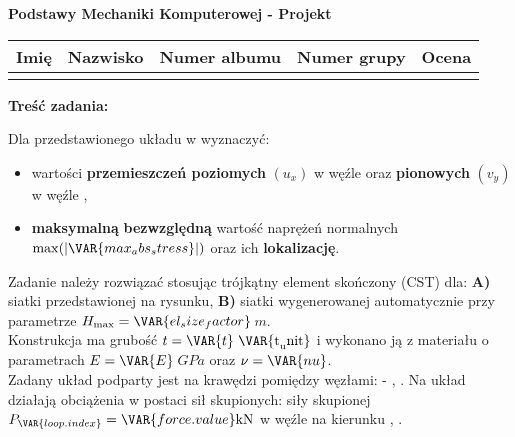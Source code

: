 \documentclass[a4paper,10pt]{article}
\begin{document}
\begin{center}
    {\Large \textbf{Podstawy Mechaniki Komputerowej - Projekt}}
    \end{center}

    \begin{table}[ht]
        \centering
        \begin{tabular}{
            m{}m{}m{}m{}m{}}
        \toprule
        Imię & Nazwisko & Numer albumu & Numer grupy  & Ocena \\ \midrule
             &          &              &              &       \\ \bottomrule
        \end{tabular}
        \label{tab:dane_studenta}
    \end{table}

    \noindent\textbf{Treść zadania:} \vspace{1mm}

    \noindent Dla przedstawionego układu w \textbf{} wyznaczyć:
    \begin{itemize}
        \item wartości \textbf{przemieszczeń poziomych} $(u_x)$ w węźle  oraz \textbf{pionowych} $(v_y)$ w węźle ,
        \item \textbf{maksymalną} \textbf{bezwzględną} wartość naprężeń normalnych $\mathrm{max}(|\VAR{max_abs_stress}|)$ oraz ich \textbf{lokalizację}.
    \end{itemize}

    \noindent Zadanie należy rozwiązać stosując trójkątny element skończony (CST) dla: \textbf{A)} siatki przedstawionej na rysunku, \textbf{B)} siatki wygenerowanej automatycznie przy parametrze $H_{\mathrm{max}} = \VAR{el_size_factor}$\,$\si{m}$. \\
    Konstrukcja ma grubość $t = \VAR{t}$\,$\si{\VAR{t_unit}}$ i wykonano ją z materiału o parametrach $E = \VAR{E}$\,$\si{GPa}$ oraz $\nu = \VAR{nu}$. \\
    Zadany układ podparty jest na krawędzi pomiędzy węzłami:
         -  %
        , 
    . 
    Na układ działają obciążenia w postaci 
             sił skupionych: 
             siły skupionej
        $P_\VAR{loop.index} = \VAR{force.value}\si{kN}$ w węźle  na kierunku %
        , 
    . \newline
\end{document}
